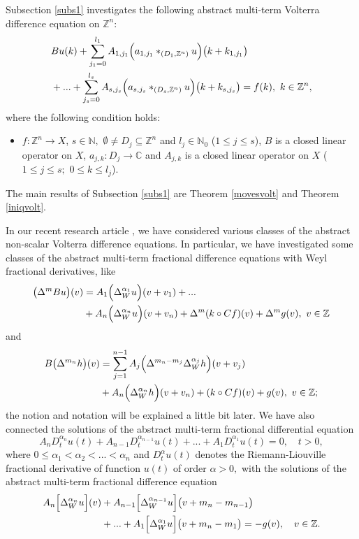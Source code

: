 \documentclass{amsart}
\theoremstyle{definition}
\theoremstyle{remark}
\numberwithin{equation}{section}
\begin{document}
Subsection \ref{subs1} investigates the following abstract multi-term Volterra difference equation on ${\mathbb Z}^{n}:$
\begin{align*}\notag & 
Bu(k)+\sum_{j_{1}=0}^{l_{1}}A_{1,j_{1}}\Bigl( a_{1,j_{1}} \ast_{(D_{1},{\mathbb Z}^{n})}u \Bigr)\bigl(k+k_{1,j_{1}}\bigr)
\\& +...+\sum_{j_{s}=0}^{l_{s}}A_{s,j_{s}}\Bigl( a_{s,j_{s}} \ast_{(D_{s},{\mathbb Z}^{n})} u\Bigr)\bigl(k+k_{s,j_{s}}\bigr)=f(k),\ k\in {\mathbb Z}^{n},
\end{align*}
where the following condition holds:
\begin{itemize}
\item[(C1)] $f: {\mathbb Z}^{n} \rightarrow X$, $s\in {\mathbb N},$ $\emptyset \neq D_{j}\subseteq {\mathbb Z}^{n}$ and $l_{j}\in {\mathbb N}_{0}$ ($1\leq j\leq s$), 
$B$ is a closed linear operator on $X$, $a_{j,k} : D_{j}\rightarrow {\mathbb C}$ and $A_{j,k}$ is a closed linear operator on $X$ ($1\leq j\leq s;$ $0\leq k\leq l_{j}$).
\end{itemize} 
The main results of Subsection \ref{subs1} are Theorem \ref{movesvolt} and Theorem \ref{iniqvolt}.

In our recent research article \cite{jan}, we have considered various classes of the abstract non-scalar Volterra difference equations. In particular, we have investigated some classes of the abstract multi-term fractional difference equations with Weyl fractional derivatives, like
\begin{align*}
\bigl( \Delta^{m} Bu\bigr)(v)&=A_{1}\Bigl(\Delta^{\alpha_{1}}_{W}u\Bigr)(v+v_{1})+...
\\& +A_{n}\Bigl(\Delta^{\alpha_{n}}_{W}u\Bigr)(v+v_{n})+\Delta^{m}(k \circ Cf)(v)+\Delta^{m}g(v),\ v\in {\mathbb Z}
\end{align*}
and
\begin{align*}
B\bigl( \Delta^{m_{n}} h\bigr)(v)&=\sum_{j=1}^{n-1}A_{j}\Bigl(\Delta^{m_{n}-m_{j}}\Delta^{\alpha_{j}}_{W}h\Bigr)(v+v_{j})
\\&+A_{n}\Bigl(\Delta^{\alpha_{n}}_{W}h\Bigr)(v+v_{n})+(k \circ Cf)(v)+g(v),\ v\in {\mathbb Z};
\end{align*}
the notion and notation will be explained a little bit later.
We have also connected the solutions of the abstract multi-term fractional differential equation
$$
A_{n}D_{t}^{\alpha_{n}}u(t)+A_{n-1}D_{t}^{\alpha_{n-1}}u(t)+...+A_{1}D_{t}^{\alpha_{1}}u(t)=0,\quad t>0,
$$
where $0\leq \alpha_{1}<\alpha_{2}<...<\alpha_{n}$ and $D_{t}^{\alpha}u(t)$ denotes the Riemann-Liouville fractional derivative of function $u(t)$ of order $\alpha>0,$ with the solutions of the abstract multi-term fractional difference equation
\begin{align*}
A_{n}\Bigl[\Delta^{\alpha_{n}}_{W}u\Bigr](v)&+A_{n-1}\Bigl[\Delta^{\alpha_{n-1}}_{W}u\Bigr]\bigl(v+m_{n}-m_{n-1}\bigr)
\\&+...+A_{1}\Bigl[\Delta^{\alpha_{1}}_{W}u\Bigr]\bigl(v+m_{n}-m_{1}\bigr)=-g(v),\quad v\in {\mathbb Z}.
\end{align*}
\end{document}
